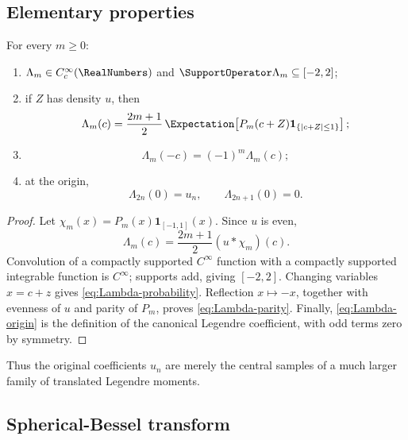 \documentclass[11pt,oneside]{article}
\numberwithin{equation}{section}
\theoremstyle{definition}
\theoremstyle{remark}
\begin{document}
\subsection{Elementary properties}

\begin{proposition}
\label{prop:Lambda-basic}
For every $m\ge0$:
\begin{enumerate}
  \item $\Lambda_m\in C_c^\infty(\RealNumbers)$ and
        $\SupportOperator\Lambda_m\subseteq[-2,2]$;
  \item if $Z$ has density $u$, then
  \begin{equation}
   \Lambda_m(c)=\frac{2m+1}{2}\,
   \Expectation\!\left[P_m(c+Z)\mathbf1_{\{|c+Z|\le1\}}\right];
   \label{eq:Lambda-probability}
  \end{equation}
  \item
  \begin{equation}
   \Lambda_m(-c)=(-1)^m\Lambda_m(c);
   \label{eq:Lambda-parity}
  \end{equation}
  \item at the origin,
  \begin{equation}
   \Lambda_{2n}(0)=u_n,
   \qquad \Lambda_{2n+1}(0)=0.
   \label{eq:Lambda-origin}
  \end{equation}
\end{enumerate}
\end{proposition}

\begin{proof}
Let $\chi_m(x)=P_m(x)\mathbf1_{[-1,1]}(x)$.  Since $u$ is even,
\[
 \Lambda_m(c)=\frac{2m+1}{2}(u*\chi_m)(c).
\]
Convolution of a compactly supported $C^\infty$ function with a compactly
supported integrable function is $C^\infty$; supports add, giving $[-2,2]$.
Changing variables $x=c+z$ gives \eqref{eq:Lambda-probability}.  Reflection
$x\mapsto-x$, together with evenness of $u$ and parity of $P_m$, proves
\eqref{eq:Lambda-parity}.  Finally, \eqref{eq:Lambda-origin} is the definition
of the canonical Legendre coefficient, with odd terms zero by symmetry.
\end{proof}

Thus the original coefficients $u_n$ are merely the central samples of a much
larger family of translated Legendre moments.

\subsection{Spherical-Bessel transform}
\end{document}
